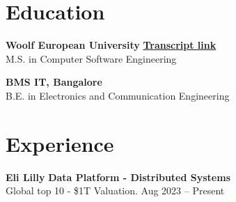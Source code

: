\documentclass[11 pt]{article}
\begin{document}
\section*{\textbf{Education}}

\noindent
\textbf{Woolf European University} \hfill \href{https://woolf.university/id/151331132?token=eyJhbGciOiJIUzI1NiJ9.eyJpZCI6IjA5MDUyMTNjLTQxMTMtNGM2MS1hZmE3LTdkZGFiNWYyOGM5NyIsImlzcyI6InVybjpXb29sZlVuaXZlcnNpdHk6c2VydmVyL3NlcnZpY2UvYWNjZXNzIiwiaXNWZXJpZmllZCI6dHJ1ZSwia2luZCI6Im9hdXRoIiwib3JnIjp7Imdyb3VwcyI6W10sImlkIjoiOWIxN2Y1Y2UtMTA3OC00ZmRmLWFlYzAtMDJiZjRlY2ZiMGE2In0sInNjb3BlIjoiKiJ9.f-CFNfydAn-GSaAiGUkWhNAT3Yn_P7C0O7cjrRH7Eq} {\textbf{Transcript link}} \ \\
\small M.S. in Computer Software Engineering

\vspace{6pt}

\noindent\textbf{BMS IT, Bangalore}  \\
\small B.E. in Electronics and Communication Engineering

\section*{\textbf{Experience}}

\noindent
{\normalsize\textbf{Eli Lilly}} \hfill \small{\textbf{Data Platform - Distributed Systems}} \\
{Global top 10 - \$1T Valuation. \hfill Aug 2023 -- Present}
\end{document}
